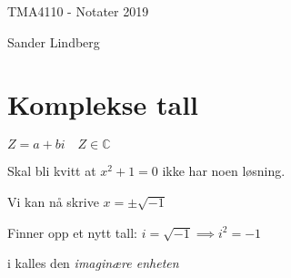 \documentclass[11pt, a4paper, norsk]{article}
\begin{document}
	\begin{titlepage}
	    \centering
	    \vspace*{\fill}

	    \vspace*{0.5cm}

	    \huge
	    TMA4110 - Notater 2019

	    \vspace*{0.5cm}

	    \large Sander Lindberg

	    \vspace*{\fill}
	\end{titlepage}
    \tableofcontents

	\newpage

	\section{Komplekse tall}
	$Z = a + bi \quad Z \in \mathbb{C}$ 

	Skal bli kvitt at $x^2 + 1 = 0$ ikke har noen løsning.

	Vi kan nå skrive $x = \pm \sqrt{-1}$

	Finner opp et nytt tall: $i=\sqrt{-1} \implies i^{2} = -1$

	i kalles den \textit{imaginære enheten}
    
\end{document}
